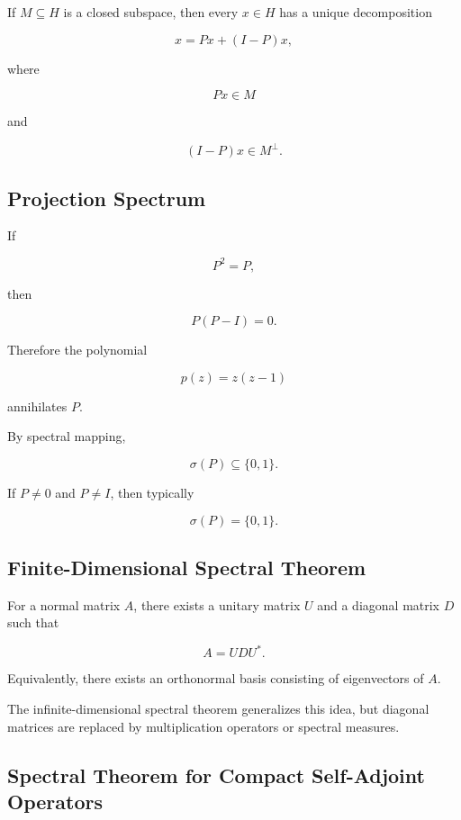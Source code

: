 If \(M\subseteq H\) is a closed subspace, then every \(x\in H\) has a
unique decomposition

\[
\boxed{
x=Px+(I-P)x,
}
\]

where

\[
Px\in M
\]

and

\[
(I-P)x\in M^\perp.
\]

\subsection{Projection Spectrum}
\label{subsec:projection-spectrum}

If

\[
P^2=P,
\]

then

\[
P(P-I)=0.
\]

Therefore the polynomial

\[
p(z)=z(z-1)
\]

annihilates \(P\).

By spectral mapping,

\[
\boxed{
\sigma(P)\subseteq\{0,1\}.
}
\]

If \(P\neq0\) and \(P\neq I\), then typically

\[
\boxed{
\sigma(P)=\{0,1\}.
}
\]

\subsection{Finite-Dimensional Spectral Theorem}
\label{subsec:finite-spectral-theorem}

For a normal matrix \(A\), there exists a unitary matrix \(U\) and a
diagonal matrix \(D\) such that

\[
\boxed{
A=UDU^*.
}
\]

Equivalently, there exists an orthonormal basis consisting of
eigenvectors of \(A\).

The infinite-dimensional spectral theorem generalizes this idea, but
diagonal matrices are replaced by multiplication operators or spectral
measures.

\subsection{Spectral Theorem for Compact Self-Adjoint Operators}
\label{subsec:compact-self-adjoint-spectral}

